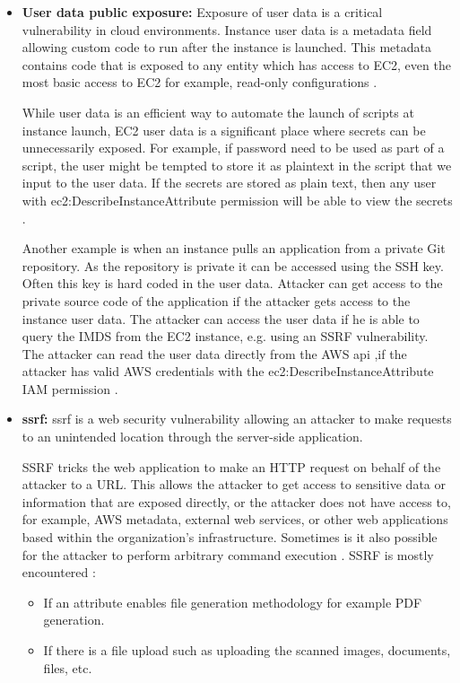 \begin{itemize}
    \item \textbf{User data public exposure:} Exposure of user data is a critical vulnerability in cloud environments.
    Instance user data is a metadata field allowing custom code to run after the instance is launched.
    This metadata
    contains code that is exposed to any entity which has access to EC2, even the most basic access to EC2 for
    example, read-only configurations \cite{48}.

    While user data is an efficient way to automate the launch of scripts at instance launch, EC2 user data is a
    significant place where secrets can be unnecessarily exposed.
    For example, if password need to be used as part of
    a script, the user might be tempted to store it as
    plaintext in the script that we input to the user data.
    If the secrets are stored as plain text, then any user with ec2:DescribeInstanceAttribute permission will be able to view the secrets \cite{59}.

    Another example is when an instance pulls an application from a private Git repository.
    As the repository is
    private it can be accessed using the SSH key.
    Often this key is hard coded in the user data.
    Attacker can get
    access to the private source code of the application if the attacker gets access to the instance user data.
    The attacker can access the user data if he is able
    to query the IMDS from the EC2 instance, e.g. using an SSRF
    vulnerability.
    The attacker can read the user data directly from the
    AWS \gls{api} ,if the attacker has valid AWS
    credentials with the ec2:DescribeInstanceAttribute
    IAM permission \cite{60}.
\end{itemize}

\begin{itemize}
    \item \textbf{\gls{ssrf}:} \gls{ssrf} is a web security
    vulnerability allowing an attacker to make requests to an unintended location through the server-side application.

    SSRF tricks the web application to make an HTTP request on behalf of the attacker to a URL. This allows the
    attacker to get access to sensitive data or information that are exposed directly, or the attacker does not have
    access to, for example, AWS metadata, external web services, or other web applications based within the
    organization’s infrastructure.
    Sometimes is it also possible for the attacker to perform arbitrary command
    execution \cite{61}.
    SSRF is mostly encountered \cite{62}:
    \begin{itemize}
        \item If an attribute enables file generation methodology for example PDF generation.
    \end{itemize}
    \begin{itemize}
        \item If there is a file upload such as uploading the scanned images, documents, files, etc.
    \end{itemize}
\end{itemize}

